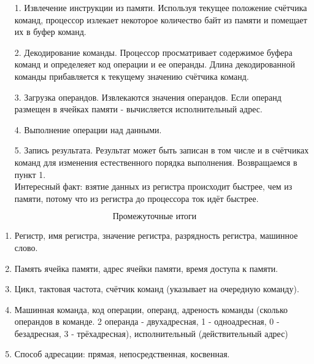\documentclass[12pt, letterpaper, twoside]{article}
\begin{document}
    \begin{enumerate}
        \item[1.] Извлечение инструкции из памяти. Используя текущее положение счётчика команд, процессор излекает некоторое количество байт из памяти и помещает их в буфер команд.
        \item[2.] Декодирование команды. Процессор просматривает содержимое буфера команд и определеяет код операции и ее операнды. Длина декодированной команды прибавляется к текущему значению счётчика команд.
        \item[3.] Загрузка операндов. Извлекаются значения операндов. Если операнд размещен в ячейках памяти - вычисляется исполнительный адрес.
        \item[4.] Выполнение операции над данными.
        \item[5.] Запись результата. Результат может быть записан в том числе и в счётчиках команд для изменения естественного порядка выполнения. Возвращаемся в пункт 1.\\
        Интересный факт: взятие данных из регистра происходит быстрее, чем из памяти, потому что из регистра до процессора ток идёт быстрее. 
    \end{enumerate}
    \[\text{Промежуточные итоги}\]
    \begin{enumerate}
        \item Регистр, имя регистра, значение регистра, разрядность регистра, машинное слово.
        \item Память ячейка памяти, адрес ячейки памяти, время доступа к памяти.
        \item Цикл, тактовая частота, счётчик команд (указывает на очередную команду).
        \item Машинная команда, код операции, операнд, адреность команды (сколько операндов в команде. 2 операнда - двухадресная, 1 - одноадресная, 0 - безадресная, 3 - трёхадресная), исполнительный (действительный адрес)
        \item Способ адресации: прямая, непосредственная, косвенная.
    \end{enumerate}
    
\end{document}
